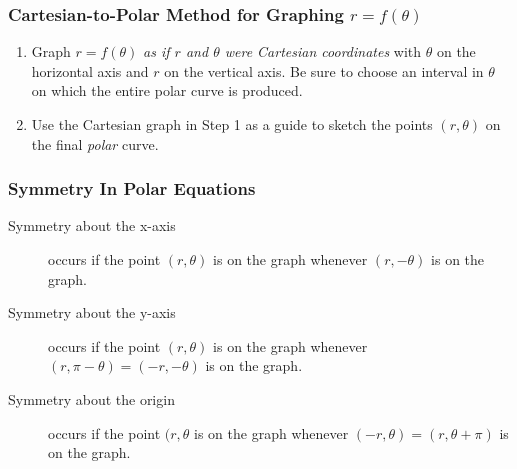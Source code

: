 \subsubsection{Cartesian-to-Polar Method for Graphing $r = f(\theta)$}
\begin{enumerate}
    \item Graph $r = f(\theta)$ \textit{as if $r$ and $\theta$ were Cartesian coordinates} with $\theta$ on the horizontal axis and $r$ on the vertical axis. Be sure to choose an interval in $\theta$ on which the entire polar curve is produced.
    \item Use the Cartesian graph in Step 1 as a guide to sketch the points $(r, \theta)$ on the final \textit{polar} curve.
\end{enumerate}


\subsubsection{Symmetry In Polar Equations}
\begin{description}
    \item [Symmetry about the x-axis] occurs if the point $(r, \theta)$ is on the graph whenever $(r, -\theta)$ is on the graph.
    \item [Symmetry about the y-axis] occurs if the point $(r, \theta)$ is on the graph whenever $(r, \pi - \theta) = (-r, -\theta)$ is on the graph.
    \item [Symmetry about the origin] occurs if the point $(r, \theta$ is on the graph whenever $(-r, \theta) = (r, \theta + \pi)$ is on the graph.
\end{description}

